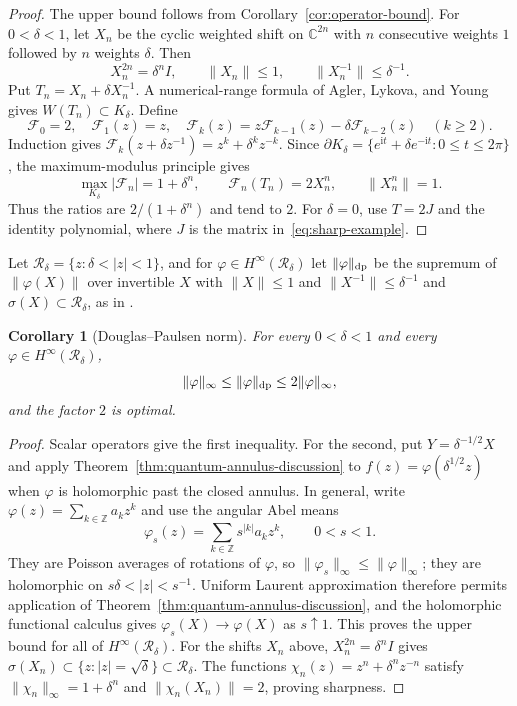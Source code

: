 \documentclass[preprints,article,submit,oneauthor]{Definitions/mdpi}
\newcounter{manuscriptresult}[section]
\theoremstyle{mdpi}
\newtheorem{corollary}[manuscriptresult]{Corollary}
\theoremstyle{definition}
\newcommand{\C}{\mathbb C}
\newcommand{\iu}{\mathrm{i}}
\begin{document}
\begin{proof}
The upper bound follows from Corollary~\ref{cor:operator-bound}.  For
$0<\delta<1$, let $X_n$ be the cyclic weighted shift
on $\C^{2n}$ with $n$ consecutive weights $1$ followed by $n$ weights
$\delta$.  Then
\[
  X_n^{2n}=\delta^nI,
  \qquad \lVert X_n\rVert\leq1,
  \qquad \lVert X_n^{-1}\rVert\leq\delta^{-1}.
\]
Put $T_n=X_n+\delta X_n^{-1}$.  A numerical-range formula of Agler,
Lykova, and Young~\cite{AglerLykovaYoung2024} gives
$W(T_n)\subset K_\delta$.  Define
\[
  \mathcal F_0=2,\quad \mathcal F_1(z)=z,\quad
  \mathcal F_k(z)=z\mathcal F_{k-1}(z)
  -\delta\mathcal F_{k-2}(z)\quad(k\geq2).
\]
Induction gives
$\mathcal F_k(z+\delta z^{-1})=z^k+\delta^kz^{-k}$.
Since
$\partial K_\delta=\{e^{\iu t}+\delta e^{-\iu t}:0\leq t\leq2\pi\}$,
the maximum-modulus principle gives
\[
  \max_{K_\delta}\lvert\mathcal F_n\rvert=1+\delta^n,
  \qquad
  \mathcal F_n(T_n)=2X_n^n,
  \qquad \lVert X_n^n\rVert=1.
\]
Thus the ratios are $2/(1+\delta^n)$ and tend to $2$.  For
$\delta=0$, use $T=2J$ and the identity polynomial, where $J$ is
the matrix in~\eqref{eq:sharp-example}.
\end{proof}

Let $\mathcal R_\delta=\{z:\delta<\lvert z\rvert<1\}$, and for
$\varphi\in H^\infty(\mathcal R_\delta)$ let
$\lVert\varphi\rVert_{\rm dp}$ be the supremum of
$\lVert\varphi(X)\rVert$ over invertible $X$ with
$\lVert X\rVert\leq1$ and
$\lVert X^{-1}\rVert\leq\delta^{-1}$ and
$\sigma(X)\subset\mathcal R_\delta$, as in
\cite{AglerLykovaYoung2025}.

\begin{corollary}[Douglas--Paulsen norm]
\label{cor:DP-discussion}
For every $0<\delta<1$ and every
$\varphi\in H^\infty(\mathcal R_\delta)$,
\[
  \lVert\varphi\rVert_\infty
  \leq\lVert\varphi\rVert_{\rm dp}
  \leq2\lVert\varphi\rVert_\infty,
\]
and the factor $2$ is optimal.
\end{corollary}

\begin{proof}
Scalar operators give the first inequality.  For the second, put
$Y=\delta^{-1/2}X$ and apply
Theorem~\ref{thm:quantum-annulus-discussion} to
$f(z)=\varphi(\delta^{1/2}z)$ when $\varphi$ is holomorphic past the
closed annulus.  In general, write
$\varphi(z)=\sum_{k\in\mathbb Z}a_kz^k$ and use the angular Abel means
\[
 \varphi_s(z)=\sum_{k\in\mathbb Z}s^{\lvert k\rvert}a_kz^k,
 \qquad 0<s<1.
\]
They are Poisson averages of rotations of $\varphi$, so
$\lVert\varphi_s\rVert_\infty\leq\lVert\varphi\rVert_\infty$; they
are holomorphic on $s\delta<\lvert z\rvert<s^{-1}$.  Uniform Laurent
approximation therefore permits application of
Theorem~\ref{thm:quantum-annulus-discussion}, and the holomorphic
functional calculus gives $\varphi_s(X)\to\varphi(X)$ as
$s\uparrow1$.  This proves the upper bound for all of
$H^\infty(\mathcal R_\delta)$.  For the shifts $X_n$ above,
$X_n^{2n}=\delta^nI$ gives
$\sigma(X_n)\subset\{z:\lvert z\rvert=\sqrt\delta\}
\subset\mathcal R_\delta$.  The functions
$\chi_n(z)=z^n+\delta^nz^{-n}$ satisfy
$\lVert\chi_n\rVert_\infty=1+\delta^n$ and
$\lVert\chi_n(X_n)\rVert=2$, proving sharpness.
\end{proof}
\end{document}
